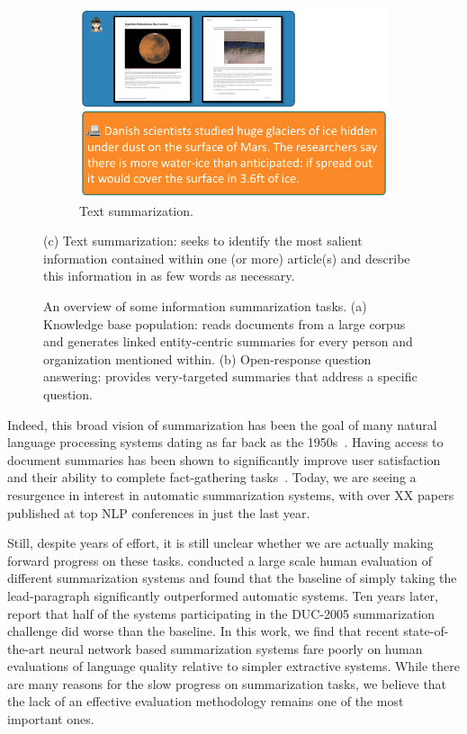 \begin{figure}
\begin{subfigure}{0.55\textwidth}
    \includegraphics[width=\textwidth]{figures/overview-summarization}
    \caption{\label{fig:intro:overview-summarization} Text summarization. }
  \end{subfigure}

  \caption{\label{fig:intro:overview} An overview of some information summarization tasks.
  (a) Knowledge base population: reads documents from a large corpus and generates linked entity-centric summaries for every person and organization mentioned within.
  (b) Open-response question answering: provides very-targeted summaries that address a specific question.}
  (c) Text summarization: seeks to identify the most salient information contained within one (or more) article(s) and describe this information in as few words as necessary.
\end{figure}

Indeed, this broad vision of summarization has been the goal of many natural language processing systems dating as far back as the 1950s~\citep{luhn1958automatic}.
Having access to document summaries has been shown to significantly improve user satisfaction and their ability to complete fact-gathering tasks~\citep{mani1999tipster, mckeown2005summaries}. 
Today, we are seeing a resurgence in interest in automatic summarization systems, with over \ac{XX} papers published at top NLP conferences in just the last year.

Still, despite years of effort, it is still unclear whether we are actually making forward progress on these tasks.
\citet{brandow1995automatic} conducted a large scale human evaluation of different summarization systems and found that the baseline of simply taking the lead-paragraph significantly outperformed automatic systems. 
Ten years later, \citet{passonneau2005applying} report that half of the systems participating in the DUC-2005 summarization challenge did worse than the baseline.
In this work, we find that recent state-of-the-art neural network based summarization systems fare poorly on human evaluations of language quality relative to simpler extractive systems.
While there are many reasons for the slow progress on summarization tasks, we believe that the lack of an effective evaluation methodology remains one of the most important ones.

